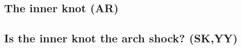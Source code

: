 \subsection{The inner knot   (AR)}
\label{sec:knot}
\subsection{Is the inner knot the arch shock?                                      (SK,YY)}